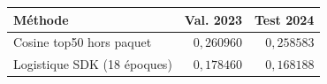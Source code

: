 \begin{tabularx}{\linewidth}{@{}Xrr@{}}
\toprule
Méthode & Val. 2023 & Test 2024 \\
\midrule
Cosine top50 hors paquet & $0{,}260960$ & $0{,}258583$ \\
Logistique SDK (18 époques) & $0{,}178460$ & $0{,}168188$ \\
\bottomrule
\end{tabularx}
